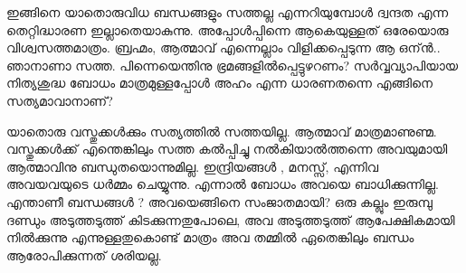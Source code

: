 ഇങ്ങിനെ യാതൊരുവിധ ബന്ധങ്ങളും സത്തല്ല എന്നറിയുമ്പോള്‍ ദ്വന്ദത എന്ന തെറ്റിദ്ധാരണ ഇല്ലാതെയാകുന്നു. അപ്പോള്‍പ്പിന്നെ ആകെയുള്ളത് ഒരേയൊരു വിശ്വസത്തമാത്രം. ബ്രഹ്മം, ആത്മാവ് എന്നെല്ലാം വിളിക്കപ്പെടുന്ന ആ ഒന്ന്‍.. ഞാനാണാ സത്ത. പിന്നെയെന്തിനു ഭ്രമങ്ങളില്‍പ്പെട്ടുഴറണം? സര്‍വ്വവ്യാപിയായ നിത്യശുദ്ധ ബോധം മാത്രമുള്ളപ്പോള്‍ അഹം എന്ന ധാരണതന്നെ എങ്ങിനെ സത്യമാവാനാണ്?

യാതൊരു വസ്തുക്കള്‍ക്കും സത്യത്തില്‍ സത്തയില്ല. ആത്മാവ് മാത്രമാണുണ്മ. വസ്തുക്കള്‍ക്ക് എന്തെങ്കിലും സത്ത കല്‍പ്പിച്ചു നല്‍കിയാല്‍ത്തന്നെ അവയുമായി ആത്മാവിനു ബന്ധുതയൊന്നുമില്ല. ഇന്ദ്രിയങ്ങള്‍ , മനസ്സ്, എന്നിവ അവയവയുടെ ധര്‍മ്മം ചെയ്യുന്നു. എന്നാല്‍ ബോധം അവയെ ബാധിക്കുന്നില്ല. എന്താണീ ബന്ധങ്ങള്‍ ? അവയെങ്ങിനെ സംജാതമായി? ഒരു കല്ലും ഇരുമ്പു ദണ്ഡും അടുത്തടുത്ത് കിടക്കുന്നതുപോലെ, അവ അടുത്തടുത്ത് ആപേക്ഷികമായി നില്‍ക്കുന്നു എന്നുള്ളതുകൊണ്ട് മാത്രം അവ തമ്മില്‍ ഏതെങ്കിലും ബന്ധം ആരോപിക്കുന്നത് ശരിയല്ല.